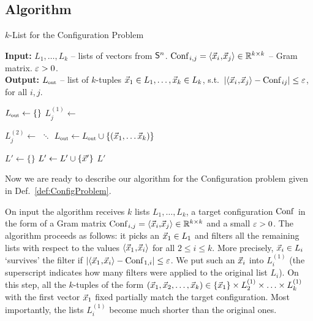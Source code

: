 \subsection{Algorithm} \label{subsec:KListAlgL2}

\begin{algorithm}[H]
\caption{$k$-List for the Configuration Problem}
\label{alg:AlgConfig}
\textbf{Input:} $L_1, \ldots, L_k$ -- lists of vectors from $\mathsf{S}^{n}$. $\text{Conf}\mkern2mu_{i,j}=\langle\vec x_i\!\mathbin{,}\!\vec x_j\rangle \in {{\mathbb R}}^{k \times k}$ -- Gram matrix. $\varepsilon>0$. \\
\textbf{Output:} $\Lout$ -- list of $k$-tuples $\vec x_1 \in L_1, \ldots, \vec x_k \in L_k$, s.t.\ $\left|\langle\vec x_i\!\mathbin{,}\!\vec x_j\rangle-\text{Conf}\mkern2mu_{ij}\right| \leq \varepsilon$, for all $i,j$.

\begin{algorithmic}[1]

\State $\Lout \gets \{ \}$ 
		\State $L_j^{(1)} \gets$  
	\EndFor
	
			\State $L_j^{(2)} \gets$  
		\EndFor	
		\State $\ddots$
		\Indent
				\State $\Lout \gets \Lout  \union \{(\xvec_1, \ldots \xvec_k)\}$
			\EndFor
		\EndIndent
	\EndFor
\EndFor 

\State{} \Return{$\Lout$} 
\end{algorithmic}
\vspace{10pt}
\begin{algorithmic}[1]
		\State $L' \gets \{ \}$
			 	\State $L' \gets L' \cup \{ \vec x' \}$
			\EndIf	
		\EndFor
		\State{} \Return $L'$
	\EndFunction
\end{algorithmic}

\end{algorithm}

Now we are ready to describe our algorithm for the Configuration problem given in Def.~\ref{def:ConfigProblem}.

On input the algorithm receives $k$ lists $L_1, \ldots, L_k$, a target configuration $\text{Conf}\mkern2mu$ in the form of a Gram matrix $\text{Conf}\mkern2mu_{i,j}=\langle{\vec x_i,}{\vec x_j}\rangle \in {{\mathbb R}}^{k \times k}$ and a small $\varepsilon>0$.
The algorithm proceeds as follows: it picks an $\vec x_1 \in L_1$ and filters all the remaining lists with respect to the values $\langle\vec x_1\!\mathbin{,}\!\vec x_i\rangle$ for all $2 \leq i \leq k$.
More precisely, $\vec x_i \in L_i$ `survives' the filter if $\left|\langle\vec x_1\!\mathbin{,}\!\vec x_i\rangle - \text{Conf}\mkern2mu_{1,i}\right|  \leq \varepsilon$.
We put such an $\vec x_i$ into $L_i^{(1)}$ (the superscript indicates how many filters were applied to the original list $L_i$).
On this step, all the $k$-tuples of the form $(\vec x_1, \vec x_2, \ldots, \vec x_k) \in \{\vec x_1\} \times L_2^{(1)} \times \ldots \times L_k^{(1)}$ with the first vector $\vec x_1$ fixed partially match the target configuration. 
Most importantly, the lists $L_i^{(1)}$ become much shorter than the original ones. 

